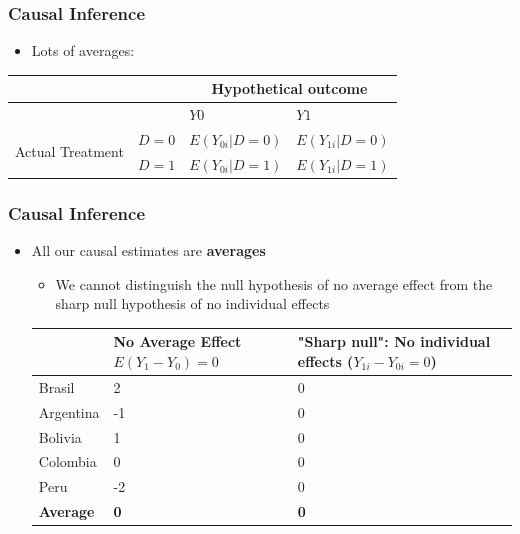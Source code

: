 \documentclass[xcolor=x11names,compress]{beamer}\usepackage[]{graphicx}\usepackage[]{color}
\renewcommand{\(}{\begin{columns}}
\renewcommand{\)}{\end{columns}}
\newcommand{\<}[1]{\begin{column}{#1}}
\renewcommand{\>}{\end{column}}
\begin{document}
\begin{frame}
\frametitle{Causal Inference}
\begin{itemize}
\item Lots of averages:
\end{itemize}
\begin{table}[htbp]
  \centering
    \begin{tabular}{|c|l|l|l|}
    \hline
          &       & \multicolumn{2}{c|}{Hypothetical outcome} \bigstrut\\
    \hline
          &       & $Y0$    & $Y1$ \bigstrut\\
    \hline
    \multirow{2}[4]{*}{Actual Treatment} & $D=0$   & \cellcolor{blue!25}$E(Y_{0i}|D=0)$ & $E(Y_{1i}|D=0)$ \bigstrut\\
\cline{2-4}          & $D=1$   & $E(Y_{0i}|D=1)$ & \cellcolor{blue!25}$E(Y_{1i}|D=1)$ \bigstrut\\
    \hline
    \end{tabular}%
  \label{tab:addlabel}%
\end{table}%
\end{frame}

\begin{frame}
\frametitle{Causal Inference}
\begin{itemize}
\item All our causal estimates are \textbf{averages}
\pause
\begin{itemize}
\item We cannot distinguish the null hypothesis of no average effect from the sharp null hypothesis of no individual effects
\pause
\end{itemize}
\footnotesize
\begin{table}[htbp]
  \centering
    \begin{tabular}{|l|p{3cm}|p{3cm}|}
    \hline
          & \multicolumn{1}{p{3cm}|}{No Average Effect $E(Y_1-Y_0)=0$} & \multicolumn{1}{p{3cm}|}{"Sharp null": No individual effects ($Y_{1i}-Y_{0i}=0$)} \bigstrut\\
    \hline
    Brasil & 2     & 0 \bigstrut\\
    \hline
    Argentina & -1    & 0 \bigstrut\\
    \hline
    Bolivia & 1     & 0 \bigstrut\\
    \hline
    Colombia & 0     & 0 \bigstrut\\
    \hline
    Peru  & -2    & 0 \bigstrut\\
    \hline
    \textbf{Average} & \textbf{0}     & \textbf{0} \bigstrut\\
    \hline
    \end{tabular}%
  \label{tab:addlabel}%
\end{table}%
\normalsize
\end{itemize}
\end{frame}
\end{document}
